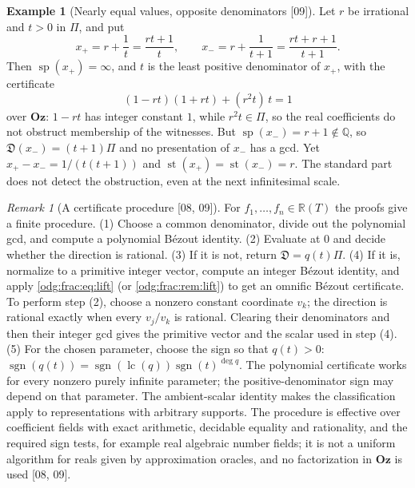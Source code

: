 \documentclass[11pt,oneside]{article}
\numberwithin{equation}{section}
\theoremstyle{definition}
\newtheorem{example}[example]{Example}
\theoremstyle{remark}
\newtheorem{remark}[remark]{Remark}
\newcommand{\Oz}{\mathbf{Oz}}
\newcommand{\Q}{\mathbb Q}
\newcommand{\R}{\mathbb R}
\newcommand{\lc}{\operatorname{lc}}
\newcommand{\src}[1]{\textup{\textsf{\small[#1]}}}
\newcommand{\st}{\operatorname{st}}
\newcommand{\Den}{\mathfrak D}
\newcommand{\spz}{\operatorname{sp}}
\begin{document}
\begin{example}[Nearly equal values, opposite denominators \src{09}]\label{odg:frac:ex:close}
Let $r$ be irrational and $t>0$ in $\Pi$, and put
\[
 x_+=r+\frac1t=\frac{rt+1}{t},\qquad x_-=r+\frac1{t+1}=\frac{rt+r+1}{t+1}.
\]
Then $\spz(x_+)=\infty$, and $t$ is the least positive denominator of $x_+$,
with the certificate
\begin{equation}\label{odg:frac:eq:closebezout}
 (1-rt)(1+rt)+(r^2t)\,t=1
\end{equation}
over $\Oz$: $1-rt$ has integer constant $1$, while $r^2t\in\Pi$,
so the real coefficients do not obstruct membership of the witnesses.
But $\spz(x_-)=r+1\notin\Q$, so $\Den(x_-)=(t+1)\Pi$ and no
presentation of $x_-$ has a gcd. Yet $x_+-x_-=1/(t(t+1))$ and
$\st(x_+)=\st(x_-)=r$. The standard part does not detect the obstruction, even
at the next infinitesimal scale.
\end{example}

\begin{remark}[A certificate procedure \src{08, 09}]\label{odg:frac:rem:procedure}
For $f_1,\ldots,f_n\in\R(T)$ the proofs give a finite procedure. (1) Choose a
common denominator, divide out the polynomial gcd, and compute a polynomial
B\'ezout identity. (2) Evaluate at $0$ and decide whether the direction is
rational. (3) If it is not, return $\Den=q(t)\Pi$. (4) If it is, normalize to a
primitive integer vector, compute an integer B\'ezout identity, and apply
\eqref{odg:frac:eq:lift} (or \cref{odg:frac:rem:lift}) to get an omnific
B\'ezout certificate. To perform step (2), choose a nonzero constant
coordinate $v_k$; the direction is rational exactly when every $v_j/v_k$
is rational. Clearing their denominators and then their integer gcd gives
the primitive vector and the scalar used in step (4).
(5) For the chosen parameter, choose the sign so that $q(t)>0$:
$\operatorname{sgn}(q(t))=\operatorname{sgn}(\lc(q))\operatorname{sgn}(t)^{\deg q}$.
The polynomial certificate works for every nonzero purely infinite parameter;
the positive-denominator sign may depend on that parameter. The ambient-scalar
identity makes the classification apply to representations with arbitrary
supports. The procedure is effective over coefficient fields with exact
arithmetic, decidable equality and rationality, and the required sign tests,
for example real algebraic number fields; it is not a uniform
algorithm for reals given by approximation oracles, and no factorization in
$\Oz$ is used \src{08, 09}.
\end{remark}
\end{document}
